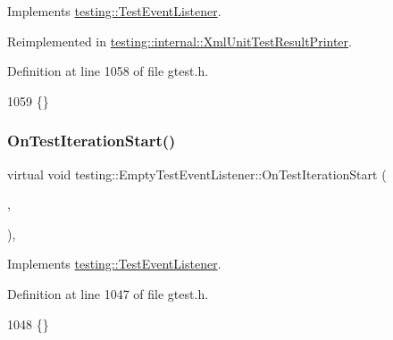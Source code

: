 Implements \hyperlink{classtesting_1_1TestEventListener_a550fdb3e55726e4cefa09f5697941425}{testing\+::\+Test\+Event\+Listener}.



Reimplemented in \hyperlink{classtesting_1_1internal_1_1XmlUnitTestResultPrinter_a2ae986dd2f4f2aed31cc6f3bc8c56898}{testing\+::internal\+::\+Xml\+Unit\+Test\+Result\+Printer}.



Definition at line 1058 of file gtest.\+h.


\begin{DoxyCode}
1059                                          \{\}
\end{DoxyCode}
\mbox{\label{classtesting_1_1EmptyTestEventListener_a836f05829855dc60d13ba99ad712c0dd}} 
\subsubsection{\texorpdfstring{On\+Test\+Iteration\+Start()}{OnTestIterationStart()}}
{\footnotesize\ttfamily virtual void testing\+::\+Empty\+Test\+Event\+Listener\+::\+On\+Test\+Iteration\+Start (\begin{DoxyParamCaption}\item[{const \hyperlink{classtesting_1_1UnitTest}{Unit\+Test} \&}]{,  }\item[{int}]{ }\end{DoxyParamCaption})\hspace{0.3cm}{\ttfamily [inline]}, {\ttfamily [virtual]}}



Implements \hyperlink{classtesting_1_1TestEventListener_a60cc09b7907cb329d152eb5e7133bdeb}{testing\+::\+Test\+Event\+Listener}.



Definition at line 1047 of file gtest.\+h.


\begin{DoxyCode}
1048                                            \{\}
\end{DoxyCode}
\mbox{\label{classtesting_1_1EmptyTestEventListener_a59e7f7d9f2e2d089a6e8c1e2577f4718}} 
